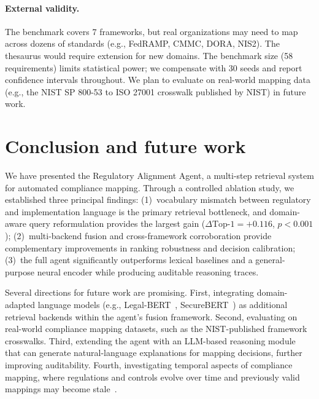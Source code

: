 \documentclass[a4paper,fleqn]{cas-sc}
\begin{document}
\paragraph{External validity.}
The benchmark covers 7 frameworks, but real organizations may need to map across dozens of standards (e.g., FedRAMP, CMMC, DORA, NIS2).
The thesaurus would require extension for new domains.
The benchmark size (58 requirements) limits statistical power; we compensate with 30 seeds and report confidence intervals throughout.
We plan to evaluate on real-world mapping data (e.g., the NIST SP 800-53 to ISO 27001 crosswalk published by NIST) in future work.


\section{Conclusion and future work}
\label{sec:conclusion}

We have presented the Regulatory Alignment Agent, a multi-step retrieval system for automated compliance mapping.
Through a controlled ablation study, we established three principal findings:
(1)~vocabulary mismatch between regulatory and implementation language is the primary retrieval bottleneck, and domain-aware query reformulation provides the largest gain ($\Delta\text{Top-1} = +0.116$, $p < 0.001$);
(2)~multi-backend fusion and cross-framework corroboration provide complementary improvements in ranking robustness and decision calibration;
(3)~the full agent significantly outperforms lexical baselines and a general-purpose neural encoder while producing auditable reasoning traces.

Several directions for future work are promising.
First, integrating domain-adapted language models (e.g., Legal-BERT~\citep{Chalkidis2020}, SecureBERT~\citep{Aghaei2022}) as additional retrieval backends within the agent's fusion framework.
Second, evaluating on real-world compliance mapping datasets, such as the NIST-published framework crosswalks.
Third, extending the agent with an LLM-based reasoning module that can generate natural-language explanations for mapping decisions, further improving auditability.
Fourth, investigating temporal aspects of compliance mapping, where regulations and controls evolve over time and previously valid mappings may become stale~\citep{Gama2014}.


\end{document}
